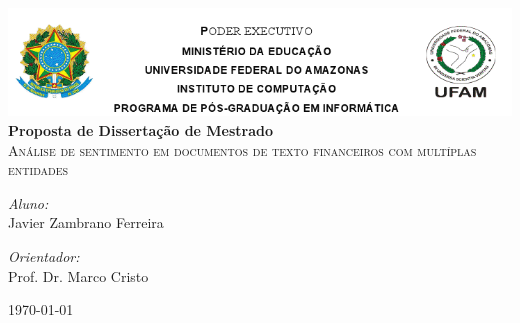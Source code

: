 
\begin{titlepage}

\begin{center}

\includegraphics[width=1.0\textwidth]{./header}\\[2cm]


{ \huge \bfseries Proposta de Dissertação de Mestrado}\\[0.4cm]

\textsc{\LARGE Análise de sentimento em documentos de texto financeiros com multíplas entidades}\\[1.5cm]

\begin{minipage}{0.4\textwidth}
\begin{flushleft} 
\emph{Aluno:}\\
Javier Zambrano Ferreira
\end{flushleft}
\end{minipage}
\begin{minipage}{0.4\textwidth}
\begin{flushright}
\emph{Orientador:} \\
Prof. Dr. Marco Cristo
\end{flushright}
\end{minipage}

\vfill

{\large \today}

\end{center}

\end{titlepage}